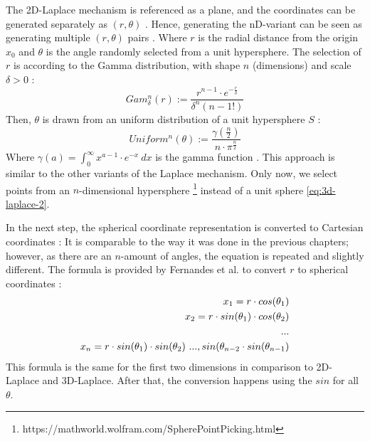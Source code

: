 The 2D-Laplace mechanism is referenced as a plane, and the coordinates can be generated separately as $(r, \theta)$ \citep{fernandes_generalised_2019,DBLP:journals/corr/abs-1212-1984}.
Hence, generating the nD-variant can be seen as generating multiple $(r, \theta)$ pairs \citep{fernandes_generalised_2019}.
Where $r$ is the radial distance from the origin $x_0$ and $\theta$ is the angle randomly selected from a unit hypersphere.
The selection of $r$ is according to the Gamma distribution, with shape $n$ (dimensions) and scale $\delta > 0$ \citep{fernandes_generalised_2019}:
\begin{equation}
  Gam^n_\delta(r) := \frac{r^{n-1}\cdot e^{-\frac{r}{\delta}}}{\delta^n(n-1!)}
  \label{eq:generate_r_for_nd_laplace}
\end{equation}
Then, $\theta$ is drawn from an uniform distribution of a unit hypersphere $S$ \citep{fernandes_generalised_2019}:
\begin{equation}
  Uniform^n(\theta) := \frac{\gamma(\frac{n}{2})}{n \cdot \pi ^{\frac{n}{2}}}
  \label{eq:generate_theta_for_nd_laplace}
\end{equation}
Where $\gamma(a) = \int^\infty_0 x^{a-1} \cdot e^{-x} \ dx$ is the gamma function \citep{fernandes_generalised_2019}.
This approach is similar to the other variants of the Laplace mechanism.
Only now, we select points from an $n$-dimensional hypersphere  \footnote{https://mathworld.wolfram.com/SpherePointPicking.html} instead of a unit sphere \ref{eq:3d-laplace-2}. \newline

In the next step, the spherical coordinate representation is converted to Cartesian coordinates \citep{fernandes_generalised_2019}:
It is comparable to the way it was done in the previous chapters; however, as there are an $n$-amount of angles, the equation is repeated and slightly different.
The formula is provided by Fernandes et al. to convert $r$ to spherical coordinates \citep{fernandes_generalised_2019}:
\begin{align}
  x_1 = r \cdot cos (\theta_1) \notag                                      \\
  x_2 = r \cdot sin (\theta_1) \cdot cos (\theta_2)                        \notag \\
  ... \notag \\
  x_n = r \cdot sin(\theta_{1}) \cdot sin(\theta_{2}) \ ..., sin(\theta_{n-2} \cdot sin(\theta_{n-1})
  \label{eq:nd-laplace-cartesian}
\end{align}
This formula is the same for the first two dimensions in comparison to 2D-Laplace and 3D-Laplace. After that, the conversion happens using the $sin$ for all $\theta$.


